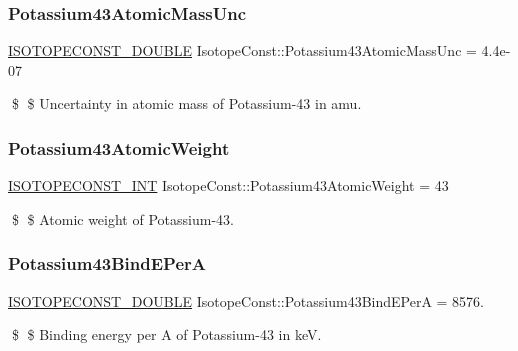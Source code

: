 \subsubsection{\texorpdfstring{Potassium43\+Atomic\+Mass\+Unc}{Potassium43AtomicMassUnc}}
{\footnotesize\ttfamily \mbox{\hyperlink{group___isotope_const-_macros_ga8f45a7272ce02c0b4c65c44636ed719a}{I\+S\+O\+T\+O\+P\+E\+C\+O\+N\+S\+T\+\_\+\+D\+O\+U\+B\+LE}} Isotope\+Const\+::\+Potassium43\+Atomic\+Mass\+Unc = 4.\+4e-\/07}

\$ \$ Uncertainty in atomic mass of Potassium-\/43 in amu. \mbox{\label{group___isotope_const-_potassium-_k43_gad5f6a4b2b7543a3f92912828f8ef57d9}} 
\subsubsection{\texorpdfstring{Potassium43\+Atomic\+Weight}{Potassium43AtomicWeight}}
{\footnotesize\ttfamily \mbox{\hyperlink{group___isotope_const-_macros_ga5f18360b3e99483a35c32d789e62621c}{I\+S\+O\+T\+O\+P\+E\+C\+O\+N\+S\+T\+\_\+\+I\+NT}} Isotope\+Const\+::\+Potassium43\+Atomic\+Weight = 43}

\$ \$ Atomic weight of Potassium-\/43. \mbox{\label{group___isotope_const-_potassium-_k43_gad4e2a5c29caab5eb431ae55db4453f01}} 
\subsubsection{\texorpdfstring{Potassium43\+Bind\+E\+PerA}{Potassium43BindEPerA}}
{\footnotesize\ttfamily \mbox{\hyperlink{group___isotope_const-_macros_ga8f45a7272ce02c0b4c65c44636ed719a}{I\+S\+O\+T\+O\+P\+E\+C\+O\+N\+S\+T\+\_\+\+D\+O\+U\+B\+LE}} Isotope\+Const\+::\+Potassium43\+Bind\+E\+PerA = 8576.}

\$ \$ Binding energy per A of Potassium-\/43 in keV. \mbox{\label{group___isotope_const-_potassium-_k43_ga73a98276c2fe726e65bc5e60d863a1b0}} 
